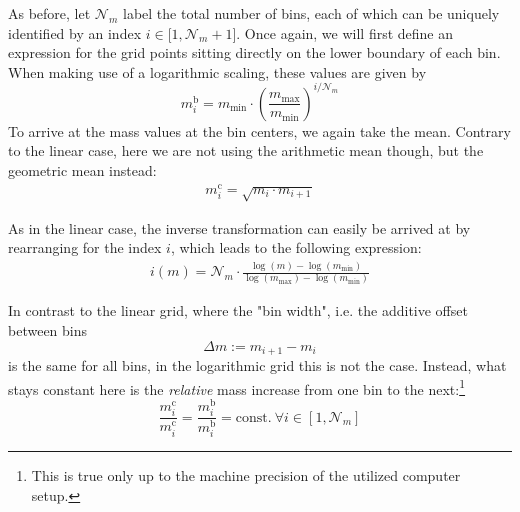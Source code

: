         As before, let $\mathcal N_m$ label the total number of bins, each of which can be uniquely 
        identified by an index $i\in\mathcal[1,\mathcal N_m+1]$. Once again, we will first define 
        an expression for the grid points sitting directly on the lower boundary of each bin. When
        making use of a logarithmic scaling, these values are given by
        \begin{equation}
            m_i^\text{b}
                =m_\text{min}\cdot\left(\frac{m_\text{max}}{m_\text{min}}\right)^{i/\mathcal N_m}
        \end{equation}
        To arrive at the mass values at the bin centers, we again take the mean. Contrary to the 
        linear case, here we are not using the arithmetic mean though, but the geometric mean
        instead:
        \begin{align}
            m_i^\text{c}
                =\sqrt{m_i\cdot m_{i+1}}
        \end{align}
    
        As in the linear case, the inverse transformation can easily be arrived at by rearranging
        for the index $i$, which leads to the following expression:
        \begin{align}
            i(m) = \mathcal N_m\cdot \frac{
                \log(m)-\log(m_\text{min})
            }{
                \log(m_\text{max})-\log(m_\text{min})
            }
        \end{align}
        
        In contrast to the linear grid, where the "bin width", i.e. the additive offset between bins
        \begin{equation}
            \Delta m := m_{i+1} - m_i
        \end{equation}
        is the same for all bins, in the logarithmic grid this is not the case. Instead, what stays
        constant here is the \textit{relative} mass increase from one bin to the next:\footnote{This
        is true only up to the machine precision of the utilized computer setup.}
        \begin{equation}
            \frac{m_i^\text{c}}{m_i^\text{c}}
                =\frac{m_i^\text{b}}{m_i^\text{b}}
                =\text{const.}\ \forall i\in[1,\mathcal N_m]
        \end{equation}

